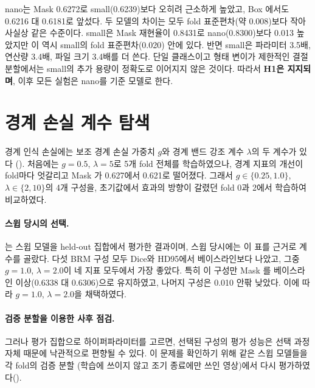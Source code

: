 

nano는 Mask \mAP{} 0.6272로 small(0.6239)보다 오히려 근소하게 높았고, Box \mAP{}에서도 0.6216 대 0.6181로
앞섰다. 두 모델의 차이는 모두 fold 표준편차(약 0.008)보다 작아 사실상 같은 수준이다. small은 Mask 재현율이
0.8431로 nano(0.8300)보다 0.013 높았지만 이 역시 small의 fold 표준편차(0.020) 안에 있다. 반면 small은 파라미터
3.5배, 연산량 3.4배, 파일 크기 3.4배를 더 쓴다. 단일 클래스이고 형태 변이가 제한적인 결절 분할에서는 small의
추가 용량이 정확도로 이어지지 않은 것이다. 따라서 \textbf{H1은 지지되며}, 이후 모든 실험은 nano를 기준 모델로 한다.

\section{경계 손실 계수 탐색}\label{sec:sweep}

경계 인식 손실에는 보조 경계 손실 가중치 $g$와 경계 밴드 강조 계수 $\lambda$의 두 계수가 있다
(). 처음에는 $g=0.5$, $\lambda=5$로 5개 fold 전체를 학습하였으나, 경계 지표의 개선이 fold마다
엇갈리고 Mask \mAP{}가 0.627에서 0.621로 떨어졌다. 그래서 $g\in\{0.25, 1.0\}$, $\lambda\in\{2, 10\}$의 4개 구성을,
초기값에서 효과의 방향이 갈렸던 fold 0과 2에서 학습하여 비교하였다.

\paragraph{스윕 당시의 선택.} 는 스윕 모델을 held-out 집합에서 평가한 결과이며, 스윕 당시에는
이 표를 근거로 계수를 골랐다. 다섯 BRM 구성 모두 Dice와 HD95에서 베이스라인보다 나았고, 그중 $g=1.0$, $\lambda=2.0$이
네 지표 모두에서 가장 좋았다. 특히 이 구성만 Mask \mAP{}를 베이스라인 이상(0.6338 대 0.6306)으로 유지하였고,
나머지 구성은 0.010 안팎 낮았다. 이에 따라 $g=1.0$, $\lambda=2.0$을 채택하였다.



\paragraph{검증 분할을 이용한 사후 점검.} 그러나 평가 집합으로 하이퍼파라미터를 고르면, 선택된 구성의 평가 성능은
선택 과정 자체 때문에 낙관적으로 편향될 수 있다. 이 문제를 확인하기 위해 같은 스윕 모델들을 각 fold의 검증 분할
(학습에 쓰이지 않고 조기 종료에만 쓰인 영상)에서 다시 평가하였다().



